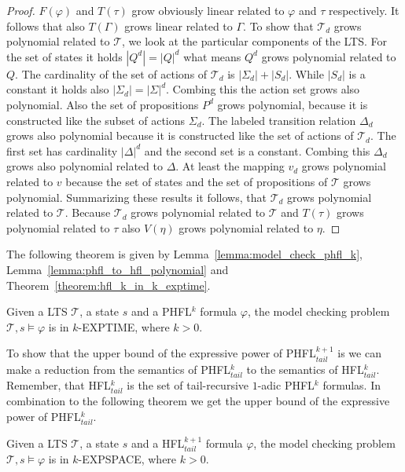 \begin{proof}
	$F(\varphi)$ and $T(\tau)$ grow obviously linear related to $\varphi$ and $\tau$ 
	respectively. It follows that also $T(\Gamma)$ grows linear related to $\Gamma$. To show 
	that $\mathcal{T}_d$ grows polynomial related to $\mathcal{T}$, we look at the particular 
	components of the LTS. For the set of states it holds $|Q^d| = |Q|^d$ what means $Q^d$ 
	grows polynomial related to $Q$. The cardinality of the set of actions of $\mathcal{T}_d$ is 
	$|\Sigma_d| + |S_d|$. While $|S_d|$ is a constant it holds also $|\Sigma_d| = |\Sigma|^d$. 
	Combing this the action set grows also polynomial. Also the set of propositions $P^d$ grows 
	polynomial, because it is constructed like the subset of actions $\Sigma_d$. The labeled 
	transition relation $\Delta_d$ grows also polynomial because it is constructed like the set of 
	actions of $\mathcal{T}_d$. The first set has cardinality $|\Delta|^d$ and the second set is a 
	constant. Combing this $\Delta_d$ grows also polynomial related to $\Delta$. At least the 
	mapping $v_d$ grows polynomial related to $v$ because the set of states and the set of 
	propositions of $\mathcal{T}$ grows polynomial. Summarizing these results it follows, that $
	\mathcal{T}_d$ grows polynomial related to $\mathcal{T}$. Because $\mathcal{T}_d$ grows 
	polynomial related to $\mathcal{T}$ and $T(\tau)$ grows polynomial related to $\tau$ also 
	$V(\eta)$ grows polynomial related to $\eta$. 
\end{proof}

The following theorem is given by Lemma~\ref{lemma:model_check_phfl_k}, Lemma~\ref{lemma:phfl_to_hfl_polynomial} and Theorem~\ref{theorem:hfl_k_in_k_exptime}.

\begin{theorem}
    \label{theorem:phfl_k_in_k_exptime}
    Given a LTS $\mathcal{T}$, a state $s$ and a PHFL$^k$ formula $\varphi$, the model checking problem $\mathcal{T}, s
    \models \varphi$ is in $k$-EXPTIME, where $k > 0$.
\end{theorem}

To show that the upper bound of the expressive power of PHFL$^{k + 1}_{tail}$ is  we can make a reduction from the semantics of
PHFL$^{k}_{tail}$ to the semantics of HFL$^k_{tail}$. Remember, that HFL$^k_{tail}$ is the set of tail-recursive
$1$-adic PHFL$^k$ formulas. In combination to the following theorem we get the upper bound
of the expressive power of PHFL$^k_{tail}$.

\begin{theorem}{\cite{bruse2017space}}
    \label{theorem:hfl_k_plus_1_in_k_expspace}
    Given a LTS $\mathcal{T}$, a state $s$ and a HFL$^{k + 1}_{tail}$ formula $\varphi$, the model checking problem
    $\mathcal{T}, s \models \varphi$ is in $k$-EXPSPACE, where $k > 0$.
\end{theorem}

